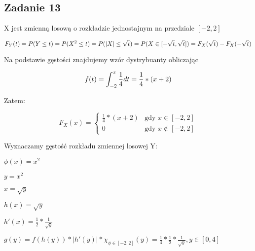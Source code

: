 \subsection{Zadanie 13}

X jest zmienną losową o rozkładzie jednostajnym na przedziale $[-2,2]$

$$F_Y(t)=P(Y \leq t)=P(X^2 \leq t)=P(|X| \leq \sqrt t)=\\
P(X \in [- \sqrt t, \sqrt t])=F_X(\sqrt t)-F_X(-\sqrt t)$$

Na podstawie gęstości znajdujemy wzór dystrybuanty obliczając 

$$f(t)=\int_{-2}^{x}\frac{1}{4}dt=\frac{1}{4}*(x+2)\\$$

Zatem:

$$
F_{X}(x)
 = \left\{ \begin{array}{ll}
\frac{1}{4}*(x+2) & \text{gdy } x \in [-2,2]\\
0 & \text{gdy } x \notin [-2,2]
\end{array} \right.
$$

Wyznaczamy gęstość rozkładu zmiennej losowej Y:

$\phi(x)=x^2$

$y=x^2$

$x= \sqrt y$

$h(x)= \sqrt y$

$h'(x)= \frac{1}{2}*\frac{1}{\sqrt y}$

$g(y)=f(h(y))*|h'(y)|*\chi_{\phi \in [-2,2]}{(y)}=\frac{1}{4}*\frac{1}{2}*\frac{1}{\sqrt y}, y \in [0,4]$
